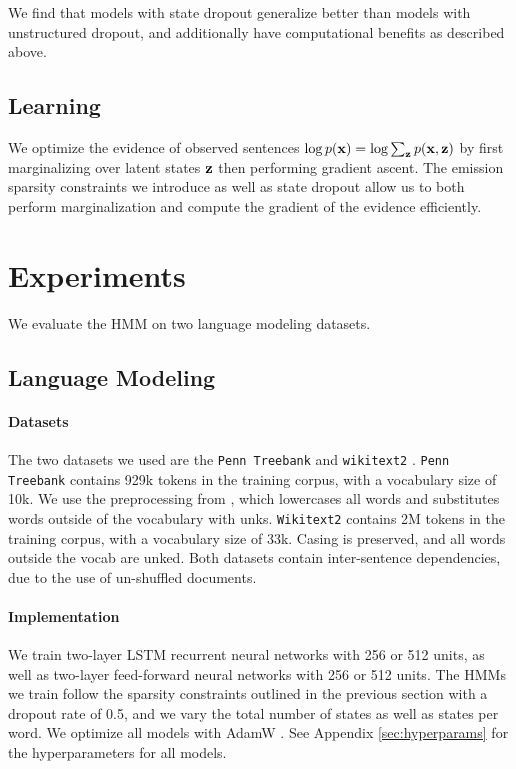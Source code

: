 \documentclass[11pt,a4paper]{article}
\begin{document}
We find that models with state dropout
generalize better than models with unstructured dropout,
and additionally have computational benefits as described above.


\subsection{Learning}
We optimize the evidence of observed sentences $\log p(\mathbf{x}) = \log \sum_{\mathbf{z}} p(\mathbf{x},\mathbf{z})$
by first marginalizing over latent states $\mathbf{z}$ then performing gradient ascent.
The emission sparsity constraints we introduce as well as state dropout
allow us to both perform marginalization
and compute the gradient of the evidence efficiently.

\section{Experiments}
We evaluate the HMM on two language modeling datasets.

\subsection{Language Modeling}
\paragraph{Datasets}
The two datasets we used are the \texttt{Penn Treebank} \citep{ptb}
and \texttt{wikitext2} \citep{wikitext}.
\texttt{Penn Treebank} contains 929k tokens in the training corpus,
with a vocabulary size of 10k.
We use the preprocessing from \citet{mikolov-2011},
which lowercases all words and substitutes words outside of the vocabulary
with unks. 
\texttt{Wikitext2} contains 2M tokens in the training corpus,
with a vocabulary size of 33k.
Casing is preserved, and all words outside the vocab are unked.
Both datasets contain inter-sentence dependencies,
due to the use of un-shuffled documents.

\paragraph{Implementation}
We train two-layer LSTM recurrent neural networks with 256 or 512 units,
as well as two-layer feed-forward neural networks with 256 or 512 units.
The HMMs we train follow the sparsity constraints outlined in the previous
section with a dropout rate of 0.5,
and we vary the total number of states as well as states per word.
We optimize all models with AdamW \citep{adamw}.
See Appendix \ref{sec:hyperparams} for the hyperparameters for all models.
\end{document}
